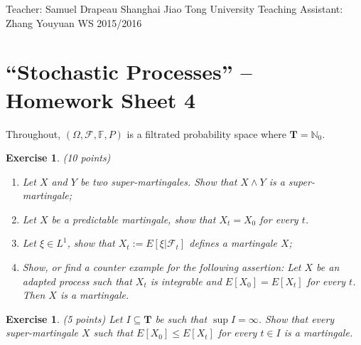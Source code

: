 \documentclass[DIV=classic,a4paper,10pt]{scrartcl}
\newtheorem{exercise}[theorem]{Exercise}
\theoremstyle{nonumberplain}
\numberwithin{equation}{section}
\begin{document}
\noindent
Teacher: Samuel Drapeau \hfill Shanghai Jiao Tong University \newline
Teaching Assistant: Zhang Youyuan \hfill WS 2015/2016

\smallskip
\noindent
\hrulefill

\smallskip

\setcounter{section}{4}

\pagestyle{empty}


\section*{``Stochastic Processes'' -- Homework Sheet 4}
\thispagestyle{empty}


Throughout, $(\Omega, \mathcal{F}, \mathbb{F},P)$ is a filtrated probability space where $\mathbf{T}=\mathbb{N}_0$.




\begin{exercise}(10 points)
    \begin{enumerate}[label=\textit{(\alph*)}]
        \item Let $X$ and $Y$ be two super-martingales.
            Show that $X\wedge Y$ is a super-martingale;
        \item Let $X$ be a predictable martingale, show that $X_t=X_0$ for every $t$.
        \item Let $\xi \in L^1$, show that $X_t:=E[\xi |\mathcal{F}_t]$ defines a martingale $X$;
        \item Show, or find a counter example for the following assertion: Let $X$ be an adapted process such that $X_t$ is integrable and $E[X_0]=E[X_t]$ for every $t$. Then $X$ is a martingale.
    \end{enumerate}
\end{exercise}


\begin{exercise}(5 points)
    Let $I\subseteq \mathbf{T}$ be such that $\sup I=\infty$.
    Show that every super-martingale $X$ such that $E[X_0]\leq E[X_t]$ for every $t \in I$ is a martingale.
\end{exercise}
\end{document}
